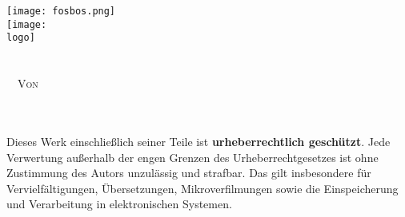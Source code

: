 \begin{titlepage}
\begin{center}
\texttt{[image: fosbos.png]}\\[10ex]

\texttt{[image: \\logo]}\\[5ex]
\LARGE{\textsc{\documentTitle}}\\[1ex]
\Large{\textsc{\documentSubtitle}}\\[10ex]

\vspace*{\fill}
\normalsize
\noindent
\xrfill[0.7ex]{1pt}\ \ \textsc{Von}\ \ \xrfill[0.7ex]{1pt}\\
\textsc{\authorName}\\[1ex]
\textsc{\deadline}\\[10ex]


\end{center}
\small
\noindent
Dieses Werk einschließlich seiner Teile ist \textbf{urheberrechtlich geschützt}.
Jede Verwertung außerhalb der engen Grenzen des Urheberrechtgesetzes ist ohne
Zustimmung des Autors unzulässig und strafbar. Das gilt insbesondere für
Vervielfältigungen, Übersetzungen, Mikroverfilmungen sowie die Einspeicherung
und Verarbeitung in elektronischen Systemen.
\end{titlepage}